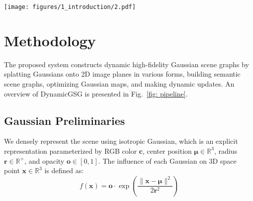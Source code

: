\begin{figure*}
  \centering
  \texttt{[image: figures/1\_introduction/2.pdf]}
  \caption{\textbf{Overview of DynamicGSG}: Our system processes posed RGB-D sequences, utilizes open-vocabulary object detection and segmentation models to obtain 2D masks, and extracts corresponding semantic features. In parallel, we employ instance-level rendering to get 2D masks and semantic features of objects in the map for object fusion. Subsequently, we perform Gaussian initialization and joint optimization to incrementally create a high-fidelity object-centric Gaussian map. Based on the spatial relationship of objects and the capabilities of LVLM, we construct a hierarchical scene graph to provide a structured description of the scene. In dynamic real-world scenarios, after refining the initial camera poses obtained from VINS-Fusion\cite{qin2019a}, we detect local changes and make corresponding modifications in the Gaussian map and scene graph for environment adaptation.%
}
  \label{fig: pipeline}
\end{figure*}

\section{Methodology}
\label{sec:methodology}
The proposed system constructs dynamic high-fidelity Gaussian scene graphs by splatting Gaussians onto 2D image planes in various forms, building semantic scene graphs, optimizing Gaussian maps, and making dynamic updates. An overview of DynamicGSG is presented in Fig.~\ref{fig: pipeline}.

\subsection{Gaussian Preliminaries}
\label{subsec:gaussians}
We densely represent the scene using isotropic Gaussian, which is an explicit representation parameterized by RGB color $\mathbf{c}$, center position $\boldsymbol{\mu} \in \mathbb{R}^3 $, radius $\mathbf{r}  \in \mathbb{R}^+$, and opacity $\mathbf{o} \in [0,1]$. The influence of each Gaussian on 3D space point $\mathbf{x} \in \mathbb{R}^3$ is defined as:
\begin{equation}
\label{eq:opacity}
f(\mathbf{x}) = \mathbf{o} \cdot \exp\left( \frac{\|\mathbf{x} - \boldsymbol{\mu}\|^2}{2\mathbf{r}^2}\right)
\end{equation}

